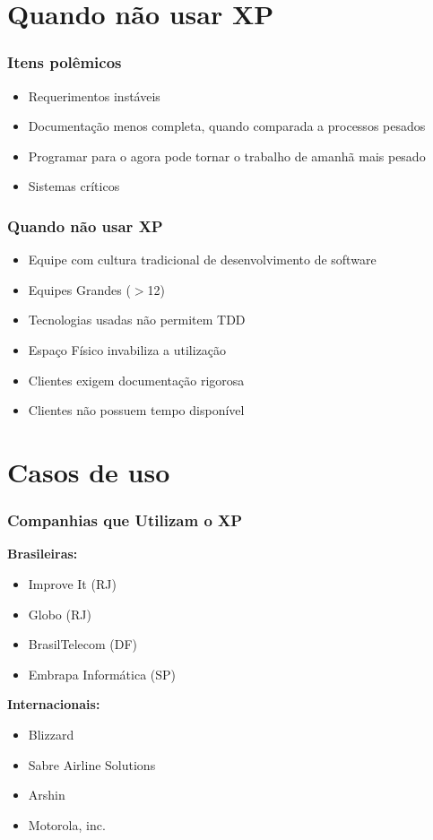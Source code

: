 \documentclass[10pt]{beamer}
\begin{document}
\section{Quando não usar XP}


\begin{frame}
  \frametitle{Itens polêmicos}
  \begin{itemize}
  \item Requerimentos instáveis
  \item Documentação menos completa, quando comparada a processos pesados
  \item Programar para o agora pode tornar o trabalho de amanhã mais pesado
  \item Sistemas críticos
  \end{itemize}
\end{frame}


\begin{frame}
  \frametitle{Quando não usar XP}
  \begin{itemize}
  \item Equipe com cultura tradicional de desenvolvimento de software
  \item Equipes Grandes ($>$12)
  \item Tecnologias usadas não permitem TDD
  \item Espaço Físico invabiliza a utilização
  \item Clientes exigem documentação rigorosa
  \item Clientes não possuem tempo disponível
  \end{itemize}
\end{frame}

\section{Casos de uso}
\begin{frame}
  \frametitle{Companhias que Utilizam o XP}
  \textbf{Brasileiras:}
  \begin{itemize}
    \item Improve It (RJ)
    \item Globo (RJ)
    \item BrasilTelecom (DF)
    \item Embrapa Informática (SP)
  \end{itemize}
  \textbf{Internacionais:}
  \begin{itemize}
    \item Blizzard
    \item Sabre Airline Solutions
    \item Arshin
    \item Motorola, inc.
  \end{itemize}
\end{frame}
\end{document}
